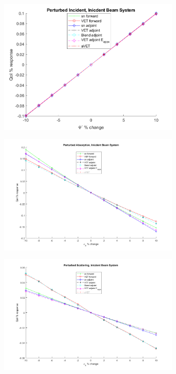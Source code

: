 \documentclass[12pt]{report}
\begin{document}
\begin{figure}[H]
\centering
\begin{subfigure}{.5\textwidth}
  \centering
  \includegraphics[width=.98\linewidth]{figures2/25incSens.png}
\end{subfigure}%
\begin{subfigure}{.5\textwidth}
  \centering
  \includegraphics[width=.98\linewidth]{figures2/25sigaSensNoavet.png}
\end{subfigure}
%
\begin{subfigure}{.5\textwidth}
  \centering
  \includegraphics[width=.98\linewidth]{figures2/25sigsSensNoavet.png}

\end{subfigure}
\end{figure}
\end{document}
